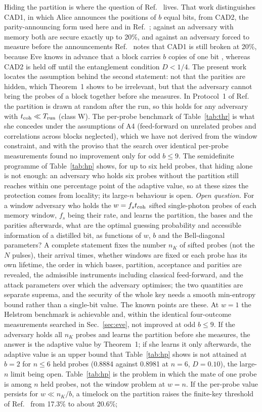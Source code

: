 \documentclass[aps,pra,twocolumn,superscriptaddress,nofootinbib]{revtex4-2}
\begin{document}
Hiding the partition is where the question of Ref.~\cite{BA07} lives. That work distinguishes CAD1, in which Alice announces the positions of $b$ equal bits, from CAD2, the parity-announcing form used here and in Ref.~\cite{T25}; against an adversary with memory both are secure exactly up to 20\%, and against an adversary forced to measure before the announcements Ref.~\cite{BA07} notes that CAD1 is still broken at 20\%, because Eve knows in advance that a block carries $b$ copies of one bit \cite{ABBMM05}, whereas CAD2 is held off until the entanglement condition $D<1/4$. The present work locates the assumption behind the second statement: not that the parities are hidden, which Theorem~1 shows to be irrelevant, but that the adversary cannot bring the probes of a block together before she measures. In Protocol~1 of Ref.~\cite{T25} the partition is drawn at random after the run, so this holds for any adversary with $t_{\rm coh}\ll T_{\rm run}$ (class W). The per-probe benchmark of Table~\ref{tab:thr} is what she concedes under the assumptions of A4 (feed-forward on unrelated probes and correlations across blocks neglected), which we have not derived from the window constraint, and with the proviso that the search over identical per-probe measurements found no improvement only for odd $b\le9$. The semidefinite programme of Table~\ref{tab:hp} shows, for up to six held probes, that hiding alone is not enough: an adversary who holds six probes without the partition still reaches within one percentage point of the adaptive value, so at these sizes the protection comes from locality; its large-$n$ behaviour is open. \emph{Open question.} For a window adversary who holds the $w=f_st_{\rm coh}$ sifted single-photon probes of each memory window, $f_s$ being their rate, and learns the partition, the bases and the parities afterwards, what are the optimal guessing probability and accessible information of a distilled bit, as functions of $w$, $b$ and the Bell-diagonal parameters? A complete statement fixes the number $n_K$ of sifted probes (not the $N$ pulses), their arrival times, whether windows are fixed or each probe has its own lifetime, the order in which bases, partition, acceptance and parities are revealed, the admissible instruments including classical feed-forward, and the attack parameters over which the adversary optimises; the two quantities are separate suprema, and the security of the whole key needs a smooth min-entropy bound rather than a single-bit value. The known points are these. At $w=1$ the Helstrom benchmark is achievable and, within the identical four-outcome measurements searched in Sec.~\ref{sec:eve}, not improved at odd $b\le9$. If the adversary holds all $n_K$ probes and learns the partition before she measures, the answer is the adaptive value by Theorem~1; if she learns it only afterwards, the adaptive value is an upper bound that Table~\ref{tab:hp} shows is not attained at $b=2$ for $n\le6$ held probes (0.8884 against 0.8981 at $n=6$, $D=0.10$), the large-$n$ limit being open. Table~\ref{tab:hp} is the problem in which the mate of one probe is among $n$ held probes, not the window problem at $w=n$. If the per-probe value persists for $w\ll n_K/b$, a timelock on the partition raises the finite-key threshold of Ref.~\cite{T25} from 17.3\% to about 20.6\%; 
\end{document}
